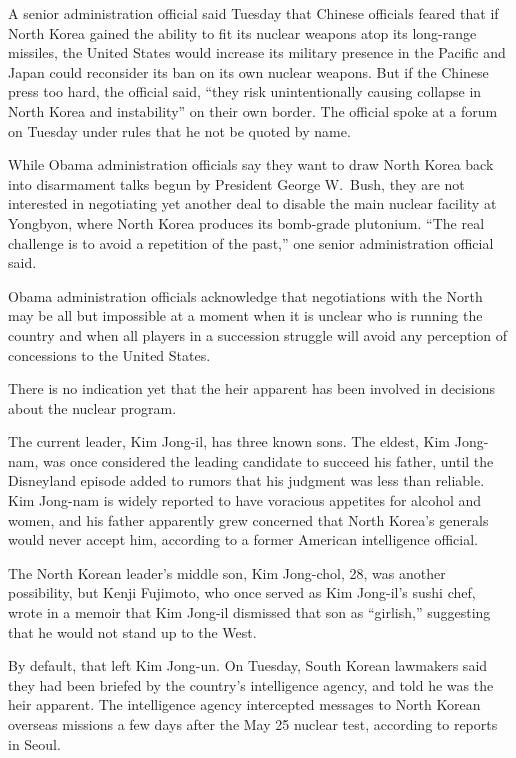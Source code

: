 \documentclass[12pt,a4paper,onecolumn]{article}
\begin{document}
A senior administration official said Tuesday that Chinese officials feared that if North Korea
gained the ability to fit its nuclear weapons atop its long-range missiles, the United States would
increase its military presence in the Pacific and Japan could reconsider its ban on its own nuclear
weapons. But if the Chinese press too hard, the official said, ``they risk unintentionally causing
collapse in North Korea and instability'' on their own border. The official spoke at a forum on
Tuesday under rules that he not be quoted by name.

While Obama administration officials say they want to draw North Korea back into disarmament talks
begun by President George W.~Bush, they are not interested in negotiating yet another deal to
disable the main nuclear facility at Yongbyon, where North Korea produces its bomb-grade plutonium.
``The real challenge is to avoid a repetition of the past,'' one senior administration official
said.

Obama administration officials acknowledge that negotiations with the North may be all but
impossible at a moment when it is unclear who is running the country and when all players in a
succession struggle will avoid any perception of concessions to the United States.

There is no indication yet that the heir apparent has been involved in decisions about the nuclear
program.

The current leader, Kim Jong-il, has three known sons. The eldest, Kim Jong-nam, was once considered
the leading candidate to succeed his father, until the Disneyland episode added to rumors that his
judgment was less than reliable. Kim Jong-nam is widely reported to have voracious appetites for
alcohol and women, and his father apparently grew concerned that North Korea's generals would never
accept him, according to a former American intelligence official.

The North Korean leader's middle son, Kim Jong-chol, 28, was another possibility, but Kenji
Fujimoto, who once served as Kim Jong-il's sushi chef, wrote in a memoir that Kim Jong-il dismissed
that son as ``girlish,'' suggesting that he would not stand up to the West.

By default, that left Kim Jong-un. On Tuesday, South Korean lawmakers said they had been briefed by
the country's intelligence agency, and told he was the heir apparent. The intelligence agency
intercepted messages to North Korean overseas missions a few days after the May 25 nuclear test,
according to reports in Seoul.
\end{document}
